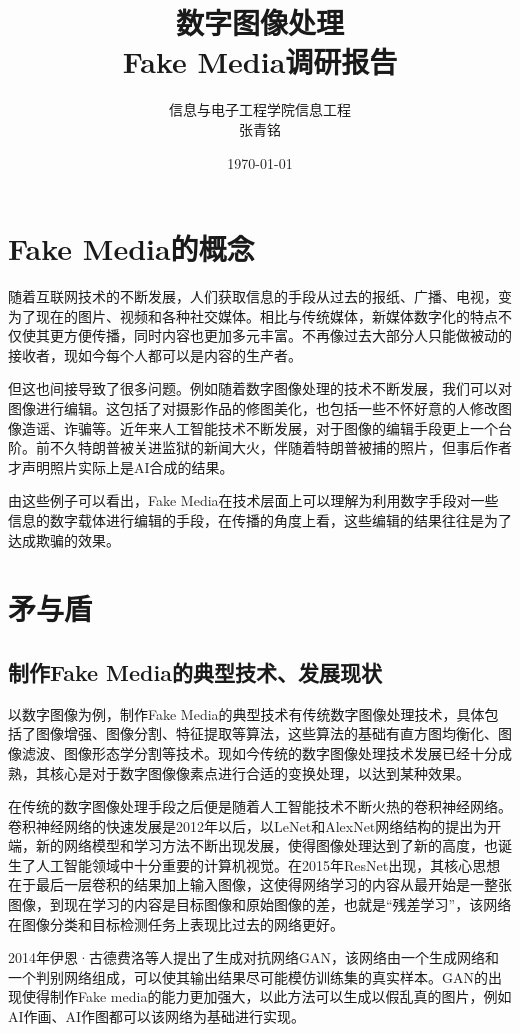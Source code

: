 \documentclass[12pt]{article} %
\title{\textbf{数字图像处理}\\Fake Media调研报告}
\author{信息与电子工程学院\quad 信息工程 \quad 3200105426\\张青铭}
\date{\today}
\begin{document}
\maketitle

\section{Fake Media的概念}
随着互联网技术的不断发展，人们获取信息的手段从过去的报纸、广播、电视，变为了现在的图片、视频和各种社交媒体。相比与传统媒体，新媒体数字化的特点不仅使其更方便传播，同时内容也更加多元丰富。不再像过去大部分人只能做被动的接收者，现如今每个人都可以是内容的生产者。

但这也间接导致了很多问题。例如随着数字图像处理的技术不断发展，我们可以对图像进行编辑。这包括了对摄影作品的修图美化，也包括一些不怀好意的人修改图像造谣、诈骗等。近年来人工智能技术不断发展，对于图像的编辑手段更上一个台阶。前不久特朗普被关进监狱的新闻大火，伴随着特朗普被捕的照片，但事后作者才声明照片实际上是AI合成的结果。

由这些例子可以看出，Fake Media在技术层面上可以理解为利用数字手段对一些信息的数字载体进行编辑的手段，在传播的角度上看，这些编辑的结果往往是为了达成欺骗的效果。
\section{矛与盾}
\subsection{制作Fake Media的典型技术、发展现状}
以数字图像为例，制作Fake Media的典型技术有传统数字图像处理技术，具体包括了图像增强、图像分割、特征提取等算法，这些算法的基础有直方图均衡化、图像滤波、图像形态学分割等技术。现如今传统的数字图像处理技术发展已经十分成熟，其核心是对于数字图像像素点进行合适的变换处理，以达到某种效果。

在传统的数字图像处理手段之后便是随着人工智能技术不断火热的卷积神经网络。卷积神经网络的快速发展是2012年以后，以LeNet和AlexNet网络结构的提出为开端，新的网络模型和学习方法不断出现发展，使得图像处理达到了新的高度，也诞生了人工智能领域中十分重要的计算机视觉。在2015年ResNet出现，其核心思想在于最后一层卷积的结果加上输入图像，这使得网络学习的内容从最开始是一整张图像，到现在学习的内容是目标图像和原始图像的差，也就是“残差学习”，该网络在图像分类和目标检测任务上表现比过去的网络更好。

2014年伊恩·古德费洛等人提出了生成对抗网络GAN，该网络由一个生成网络和一个判别网络组成，可以使其输出结果尽可能模仿训练集的真实样本。GAN的出现使得制作Fake media的能力更加强大，以此方法可以生成以假乱真的图片，例如AI作画、AI作图都可以该网络为基础进行实现。
\end{document}
